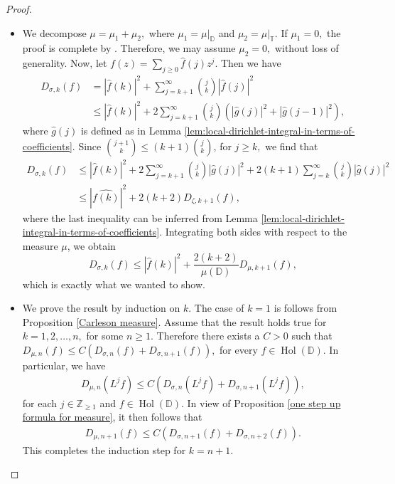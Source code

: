 \documentclass[10pt,oneside,reqno]{amsart}
\theoremstyle{definition}
\theoremstyle{remark}
\newcommand{\abs}[1]{\left\lvert #1 \right\rvert}
\renewcommand{\le}{\leqslant}
\renewcommand{\ge}{\geqslant}
\newcommand{\D}{\mathbb D}
\newcommand{\T}{\mathbb T}
\numberwithin{equation}{section}
\begin{document}
\begin{proof}\begin{itemize}
    \item[(i)] We decompose $\mu=\mu_1+\mu_2,$ where $\mu_{1}= \mu|_{\D}$ and $\mu_2 = \mu|_{\T}$. If $\mu_1=0,$ the proof is complete by \cite[Proposition 5.5 (i)]{Rydhe19}. Therefore, we may assume $\mu_2 =0,$ without loss of generality. Now, let $f(z) = \sum_{j \ge 0} \hat{f}(j) z^j.$ Then we have 
    \begin{align*}
        D_{\sigma, k} (f)
        &= \abs{\hat{f}(k)}^2 + \sum\limits_{j=k+1}^{\infty} \binom{j}{k} \abs{\hat{f} (j)}^2 \\
        &\le \abs{\hat{f}(k)}^2 + 2 \sum_{j=k+1}^{\infty} \binom{j}{k} \left( \abs{\hat{g}(j)}^2 + \abs{\hat{g}(j-1)}^2 \right),
    \end{align*}
    where $\hat{g}(j)$ is defined as in Lemma \ref{lem:local-dirichlet-integral-in-terms-of-coefficients}. Since $\binom{j+1}{k}\le (k+1) \binom{j}{k}$, for $j\geqslant k,$ we find that
    \begin{align*}
        D_{\sigma, k} (f) &\le \abs{\hat{f} (k)}^2  + 2 \sum\limits_{j=k+1}^{\infty} \binom{j}{k} \abs{\hat{g}(j)}^2 + 2 (k+1) \sum\limits_{j=k}^{\infty} \binom{j}{k} \abs{\hat{g}(j)}^2\\
        &\le \abs{\hat{f(k)}}^2 + 2(k+2) D_{\zeta, k+1} (f),
    \end{align*}
    where the last inequality can be inferred from Lemma \ref{lem:local-dirichlet-integral-in-terms-of-coefficients}. Integrating both sides with respect to the measure $\mu$, we obtain 
    \begin{equation*}
        D_{\sigma, k} (f)  \le \abs{\hat{f}(k)}^2 + \frac{2 (k+2)}{\mu (\D)} D_{\mu, k+1} (f),
    \end{equation*}
    which is exactly what we wanted to show.
    
    \item[(ii)] We prove the result by induction on $k.$ The case of $k=1$ is follows from Proposition \ref{Carleson measure}. Assume that the result holds true for $k=1,2,\ldots,n,$ for some $n\geqslant 1.$ Therefore there exists a $C>0$ such that $D_{\mu,n}(f) \leqslant C\left( D_{\sigma,n}(f) + D_{\sigma, n+1}(f)\right),$ for every $f\in \operatorname{Hol}(\D).$  In particular, we have
    \begin{align*}
        D_{\mu,n}(L^jf) \leqslant C\left( D_{\sigma,n}(L^jf) + D_{\sigma, n+1}(L^jf)\right),
    \end{align*} for each $j\in \mathbb Z_{\geqslant 1}$ and $f\in \operatorname{Hol}(\D).$ In view of Proposition \ref{one step up formula for measure}, it then follows that 
    \begin{align*}
        D_{\mu,n+1}(f) \leqslant C \left ( D_{\sigma,n+1}(f) + D_{\sigma, n+2}(f)\right).
    \end{align*} This completes the induction step for $k=n+1.$
\end{itemize}  
\end{proof}
\end{document}
